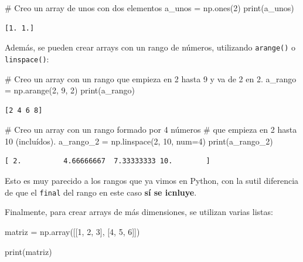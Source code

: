 \documentclass[
  letterpaper,
  DIV=11,
  numbers=noendperiod]{scrreprt}
\newenvironment{Shaded}{\begin{snugshade}}{\end{snugshade}}
\newcommand{\BuiltInTok}[1]{\textcolor[rgb]{0.00,0.23,0.31}{#1}}
\newcommand{\CommentTok}[1]{\textcolor[rgb]{0.37,0.37,0.37}{#1}}
\newcommand{\DecValTok}[1]{\textcolor[rgb]{0.68,0.00,0.00}{#1}}
\newcommand{\NormalTok}[1]{\textcolor[rgb]{0.00,0.23,0.31}{#1}}
\newcommand{\OperatorTok}[1]{\textcolor[rgb]{0.37,0.37,0.37}{#1}}
\begin{document}
\begin{Shaded}
\begin{Highlighting}[]
\CommentTok{\# Creo un array de unos con dos elementos}
\NormalTok{a\_unos }\OperatorTok{=}\NormalTok{ np.ones(}\DecValTok{2}\NormalTok{)}
\BuiltInTok{print}\NormalTok{(a\_unos)}
\end{Highlighting}
\end{Shaded}

\begin{verbatim}
[1. 1.]
\end{verbatim}

Además, se pueden crear arrays con un rango de números, utilizando
\texttt{arange()} o \texttt{linspace()}:

\begin{Shaded}
\begin{Highlighting}[]
\CommentTok{\# Creo un array con un rango que empieza en 2 hasta 9 y va de 2 en 2.}
\NormalTok{a\_rango }\OperatorTok{=}\NormalTok{ np.arange(}\DecValTok{2}\NormalTok{, }\DecValTok{9}\NormalTok{, }\DecValTok{2}\NormalTok{)}
\BuiltInTok{print}\NormalTok{(a\_rango)}
\end{Highlighting}
\end{Shaded}

\begin{verbatim}
[2 4 6 8]
\end{verbatim}

\begin{Shaded}
\begin{Highlighting}[]
\CommentTok{\# Creo un array con un rango formado por 4 números}
\CommentTok{\# que empieza en 2 hasta 10 (incluídos). }
\NormalTok{a\_rango\_2 }\OperatorTok{=}\NormalTok{ np.linspace(}\DecValTok{2}\NormalTok{, }\DecValTok{10}\NormalTok{, num}\OperatorTok{=}\DecValTok{4}\NormalTok{)}
\BuiltInTok{print}\NormalTok{(a\_rango\_2)}
\end{Highlighting}
\end{Shaded}

\begin{verbatim}
[ 2.          4.66666667  7.33333333 10.        ]
\end{verbatim}

Esto es muy parecido a los rangos que ya vimos en Python, con la sutil
diferencia de que el \texttt{final} del rango en este caso \textbf{sí se
icnluye}.

Finalmente, para crear arrays de más dimensiones, se utilizan varias
listas:

\begin{Shaded}
\begin{Highlighting}[]
\NormalTok{matriz }\OperatorTok{=}\NormalTok{ np.array([[}\DecValTok{1}\NormalTok{, }\DecValTok{2}\NormalTok{, }\DecValTok{3}\NormalTok{], [}\DecValTok{4}\NormalTok{, }\DecValTok{5}\NormalTok{, }\DecValTok{6}\NormalTok{]])}

\BuiltInTok{print}\NormalTok{(matriz)}
\end{Highlighting}
\end{Shaded}
\end{document}
